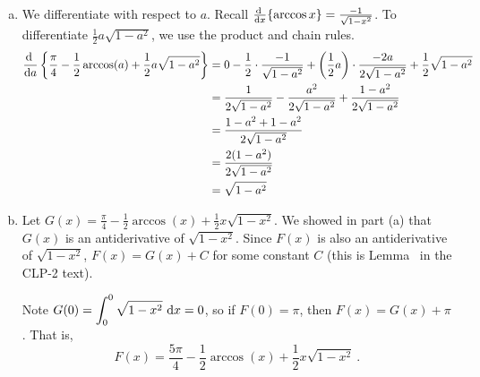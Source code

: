 \begin{solution}
\begin{enumerate}[(a)]
\item  We differentiate with respect to $a$. Recall $\diff{}{x}\{\arccos x\} = \frac{-1}{\sqrt{1-x^2}}$. To differentiate $\frac{1}{2}a\sqrt{1-a^2}$, we use the product and chain rules.
\begin{align*}
\diff{}{a}\left\{\frac{\pi}{4} - \frac{1}{2}\arccos(a)+\frac{1}{2}a\sqrt{1-a^2}\right\} &=
0-\frac{1}{2}\cdot\frac{-1}{\sqrt{1-a^2}} + \left(\frac{1}{2}a\right)\cdot\frac{-2a}{2\sqrt{1-a^2}} + \frac{1}{2}\sqrt{1-a^2}\\
&=\frac{1}{2\sqrt{1-a^2}}-
\frac{a^2}{2\sqrt{1-a^2}}+\frac{1-a^2}{2\sqrt{1-a^2}}\\
&=\frac{1-a^2+1-a^2}{2\sqrt{1-a^2}}\\
&=\frac{2(1-a^2)}{2\sqrt{1-a^2}}
\\&=\sqrt{1-a^2}
\end{align*}
\item Let $G(x) = \frac{\pi}{4}-\frac{1}{2}\arccos(x)+\frac{1}{2}x\sqrt{1-x^2}$. We showed in part (a) that $G(x)$ is an antiderivative of $\sqrt{1-x^2}$. Since $F(x)$ is also an antiderivative of $\sqrt{1-x^2}$, $F(x) = G(x)+C$ for some constant $C$ (this is Lemma~ in the CLP-2 text).

Note $G(0)=\displaystyle\int_0^0\sqrt{1-x^2}\ \mathrm{d}x =0$, so if $F(0)=\pi$, then $F(x)=G(x)+\pi$. That is,
\[F(x) =  \frac{5\pi}{4}-\frac{1}{2}\arccos(x)+\frac{1}{2}x\sqrt{1-x^2}\ .\]
\end{enumerate}

\end{solution}

